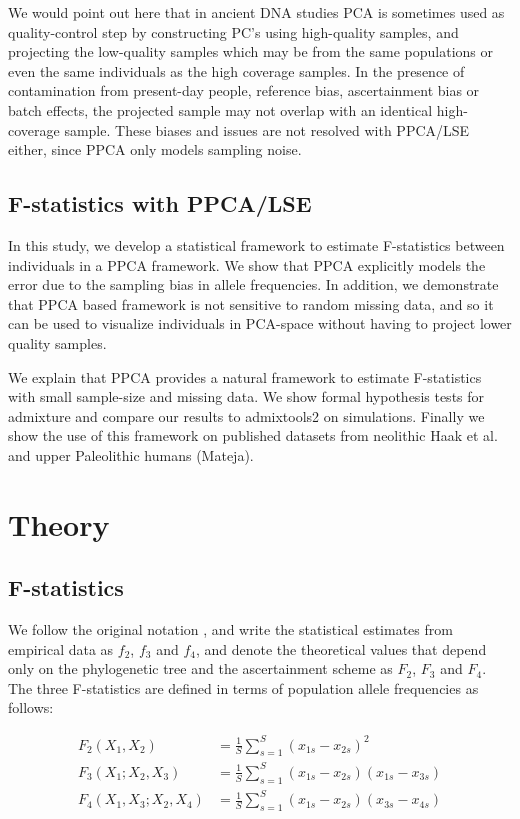 \documentclass[12pt, letterpaper]{article}
\begin{document}
We would point out here that in ancient DNA studies PCA is sometimes used as quality-control step by constructing PC's using high-quality samples, and projecting the low-quality samples which may be from the same populations or even the same individuals as the high coverage samples. In the presence of contamination from present-day people, reference bias, ascertainment bias or batch effects, the projected sample may not overlap with an identical high-coverage sample. These biases and issues are not resolved with PPCA/LSE either, since PPCA only models sampling noise. 


\subsection{F-statistics with PPCA/LSE}
In this study, we develop a statistical framework to estimate F-statistics between individuals in a PPCA framework. We show that PPCA explicitly models the error due to the sampling bias in allele frequencies. In addition, we demonstrate that PPCA based framework is not sensitive to random missing data, and so it can be used to visualize individuals in PCA-space without having to project lower quality samples.

We explain that PPCA provides a natural framework to estimate F-statistics with small sample-size and missing data. We show formal hypothesis tests for admixture and compare our results to admixtools2 \cite{maier_limits_2022} on simulations. Finally we show the use of this framework on published datasets from neolithic Haak et al. and upper Paleolithic humans (Mateja). 


\section{Theory}

\subsection{F-statistics}
We follow the original notation \cite{patterson_ancient_2012}, and write the statistical estimates from empirical data as $f_2$, $f_3$ and $f_4$, and denote the theoretical values that depend only on the phylogenetic tree and the ascertainment scheme as $F_2$, $F_3$ and $F_4$. The three F-statistics are defined in terms of population allele frequencies as follows:

\begin{align}\label{eq:f_intro}
F_2(X_1,X_2) &= \frac{1}{S}\sum_{s=1}^S(x_{1s} - x_{2s})^2\nonumber\\
F_3(X_1;X_2,X_3) &= \frac{1}{S}\sum_{s=1}^S(x_{1s} - x_{2s})(x_{1s} - x_{3s})\nonumber\\
F_4(X_1,X_3;X_2,X_4) &= \frac{1}{S}\sum_{s=1}^S(x_{1s} - x_{2s})(x_{3s} - x_{4s})\nonumber\\
\end{align}
\end{document}
